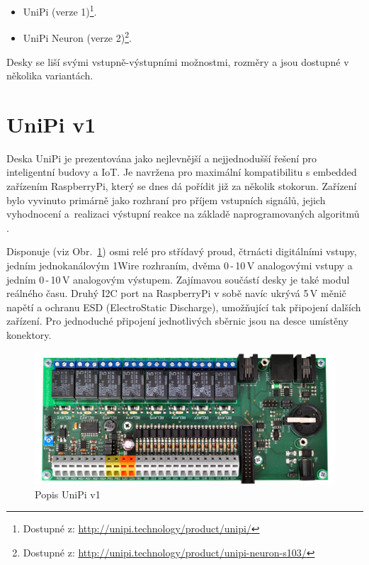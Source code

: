 \begin{itemize}
	\item UniPi (verze 1)\footnote[1]{Dostupné z: \href{http://unipi.technology/product/unipi/}{http://unipi.technology/product/unipi/}}.
	\item UniPi Neuron (verze 2)\footnote[2]{Dostupné z: \href{http://unipi.technology/product/unipi-neuron-s103/}{http://unipi.technology/product/unipi-neuron-s103/}}.
\end{itemize}

\vspace{5mm}
Desky se liší svými vstupně-výstupními možnostmi, rozměry a jsou dostupné v několika variantách.




\section{UniPi v1}
\label{KapitolaUnipi1}

Deska UniPi je prezentována jako nejlevnější a nejjednodušší řešení pro inteligentní budovy a IoT. Je navržena pro maximální kompatibilitu s embedded zařízením RaspberryPi, který se dnes dá pořídit již za několik stokorun.  Zařízení bylo vyvinuto primárně jako rozhraní pro příjem vstupních signálů, jejich vyhodnocení a~realizaci výstupní reakce na základě naprogramovaných algoritmů \cite{UniPiBoard1}.

Disponuje (viz Obr.~\ref{ObrazekUnipiV1}) osmi relé pro střídavý proud, čtrnácti digitálními vstupy, jedním jednokanálovým 1Wire rozhraním, dvěma 0\,-\,10\,V analogovými vstupy a jedním 0\,-\,10\,V analogovým výstupem. Zajímavou součástí desky je také modul reálného času. Druhý I2C port na RaspberryPi v sobě navíc ukrývá 5\,V měnič napětí a ochranu ESD (ElectroStatic Discharge), umožňující tak připojení dalších zařízení. Pro jednoduché připojení jednotlivých sběrnic jsou na desce umístěny konektory.

 \begin{figure}[!ht]
  \begin{center}
    \includegraphics[scale=0.75]{obrazky/unipi_v1}
  \end{center}
	\vspace{-20pt}
  \caption{Popis UniPi v1 \cite{UniPiBoard1}}
	\label{ObrazekUnipiV1}
	\vspace{-30pt}
\end{figure}

